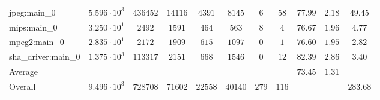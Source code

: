 \begin{tabular}{|l|c|c|c|c|c|c|c|c|c|c|}
jpeg:main\_0            & $ 5.596 \cdot 10^{3} $ & $ 436452 $ & $ 14116 $ & $ 4391  $ & $ 8145  $ & $ 6   $ & $ 58  $ & $ 77.99       $ & $ 2.18    $ & $ 49.45   $ \\
mips:main\_0            & $ 3.250 \cdot 10^{1} $ & $ 2492   $ & $ 1591  $ & $ 464   $ & $ 563   $ & $ 8   $ & $ 4   $ & $ 76.67       $ & $ 1.96    $ & $ 4.77    $ \\
mpeg2:main\_0           & $ 2.835 \cdot 10^{1} $ & $ 2172   $ & $ 1909  $ & $ 615   $ & $ 1097  $ & $ 0   $ & $ 1   $ & $ 76.60       $ & $ 1.95    $ & $ 2.82    $ \\
sha\_driver:main\_0     & $ 1.375 \cdot 10^{3} $ & $ 113317 $ & $ 2151  $ & $ 668   $ & $ 1546  $ & $ 0   $ & $ 12  $ & $ 82.39       $ & $ 2.86    $ & $ 3.40    $ \\
\hline
Average                 & $                    $ & $        $ & $       $ & $       $ & $       $ & $     $ & $     $ & $ 73.45       $ & $ 1.31    $ & $         $ \\
\hline
Overall                 & $ 9.496 \cdot 10^{3} $ & $ 728708 $ & $ 71602 $ & $ 22558 $ & $ 40140 $ & $ 279 $ & $ 116 $ & $             $ & $         $ & $ 283.68  $ \\
\hline
\end{tabular}
